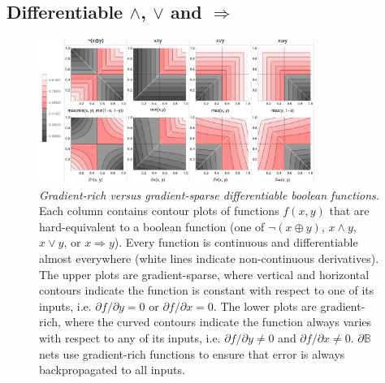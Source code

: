 \documentclass{article}
\theoremstyle{plain}
\theoremstyle{definition}
\theoremstyle{remark}
\begin{document}
\subsection{Differentiable $\wedge$, $\vee$ and $\Rightarrow$}

\begin{figure}[t!]
	\centering
	\includegraphics[trim=0pt 0pt 0pt 0pt, clip, width=0.8\textwidth]{../logic-gates.png}
	\caption{{\em Gradient-rich versus gradient-sparse differentiable boolean functions.} Each column contains contour plots of functions $f(x,y)$ that are hard-equivalent to a boolean function (one of $\neg(x \oplus y)$, $x \wedge y$, $x \vee y$, or $x \Rightarrow y$). Every function is continuous and differentiable almost everywhere (white lines indicate non-continuous derivatives). The upper plots are gradient-sparse, where vertical and horizontal contours indicate the function is constant with respect to one of its inputs, i.e. $\partial f/\partial y = 0$ or $\partial f/\partial x = 0$. The lower plots are gradient-rich, where the curved contours indicate the function always varies with respect to any of its inputs, i.e. $\partial f/\partial y \neq 0$ and $\partial f/\partial x \neq 0$. $\partial \mathbb{B}$ nets use gradient-rich functions to ensure that error is always backpropagated to all inputs.} 
	\label{fig:gradient-rich}
\end{figure}
\end{document}
